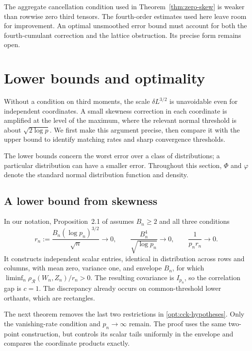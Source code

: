 \documentclass[11pt,a4paper]{article}
\theoremstyle{remark}
\newcommand{\rh}{\rho_{\mathcal R}}
\begin{document}
The aggregate cancellation condition used in
Theorem~\ref{thm:zero-skew} is weaker than rowwise zero third tensors.
The fourth-order estimates used here leave room for improvement.
An optimal unsmoothed error bound must account for both the
fourth-cumulant correction and the lattice obstruction. Its precise
form remains open.


\section{Lower bounds and optimality}
\label{opt:section}

Without a condition on third moments, the scale
\(\delta L^{3/2}\) is unavoidable even for independent coordinates. A small skewness correction in each coordinate is amplified
at the level of the maximum, where the relevant normal threshold is
about \(\sqrt{2\log p}\). We first make this argument precise, then
compare it with the upper bound to identify matching rates and sharp
convergence thresholds.

The lower bounds concern the worst error over a class of distributions;
a particular distribution can have a smaller error. Throughout this
section, \(\Phi\) and \(\varphi\) denote the standard normal distribution
function and density.

\subsection{A lower bound from skewness}
\label{opt:published}

In our notation, Proposition~2.1 of \cite{CCK} assumes \(B_n\ge2\) and
all three conditions
\begin{equation}
 r_n:=\frac{B_n(\log p_n)^{3/2}}{\sqrt n}\longrightarrow0,
 \qquad \frac{B_n^4}{\sqrt{\log p_n}}\longrightarrow0,
 \qquad \frac1{p_nr_n}\longrightarrow0.
 \label{opt:cck-hypotheses}
\end{equation}
It constructs independent scalar entries, identical in distribution
across rows and columns, with mean zero, variance one, and envelope
\(B_n\), for which \(\liminf_n\rh(W_n,Z_n)/r_n>0\). The resulting
covariance is \(I_{p_n}\), so the correlation gap is \(c=1\).
The discrepancy already occurs on common-threshold lower orthants,
which are rectangles.

The next theorem removes the last two restrictions in
\eqref{opt:cck-hypotheses}. Only the vanishing-rate condition and
\(p_n\to\infty\) remain. The proof uses the same two-point construction,
but controls its scalar tails uniformly in the envelope and compares
the coordinate products exactly.
\end{document}
